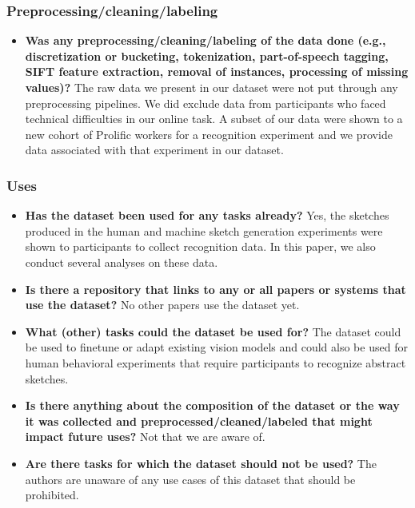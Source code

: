 \documentclass{article}
\begin{document}
\subsubsection{Preprocessing/cleaning/labeling}
\begin{itemize}
    \item \textbf{Was any preprocessing/cleaning/labeling of the data done (e.g.,
discretization or bucketing, tokenization, part-of-speech tagging,
SIFT feature extraction, removal of instances, processing of missing values)? }
The raw data we present in our dataset were not put through any preprocessing pipelines. We did exclude data from participants who faced technical difficulties in our online task.
A subset of our data were shown to a new cohort of Prolific workers for a recognition experiment and we provide data associated with that experiment in our dataset.
\end{itemize}
\subsubsection{Uses}
\begin{itemize}
    \item \textbf{Has the dataset been used for any tasks already? } Yes, the sketches produced in the human and machine sketch generation experiments were shown to participants to collect recognition data. In this paper, we also conduct several analyses on these data.
    \item \textbf{Is there a repository that links to any or all papers or systems that use the dataset?} No other papers use the dataset yet.
    \item \textbf{What (other) tasks could the dataset be used for?} The dataset could be used to finetune or adapt existing vision models and could also be used for human behavioral experiments that require participants to recognize abstract sketches.
    \item \textbf{Is there anything about the composition of the dataset or the way it was collected and preprocessed/cleaned/labeled that might impact future uses?} Not that we are aware of.
    \item \textbf{Are there tasks for which the dataset should not be used? } The authors are unaware of any use cases of this dataset that should be prohibited.
\end{itemize}
\end{document}
